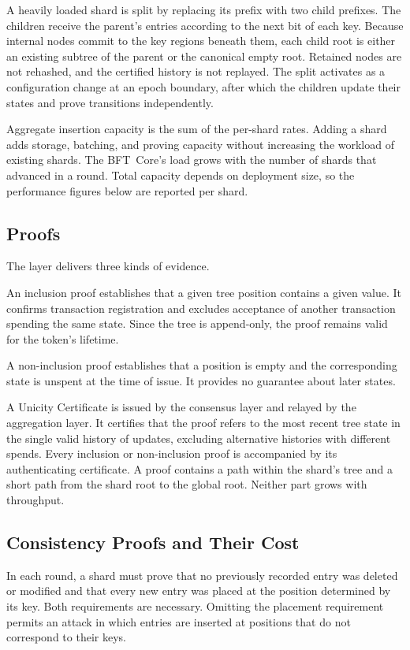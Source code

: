 A heavily loaded shard is split by replacing its prefix with two child prefixes. The children receive the parent's entries according to the next bit of each key. Because internal nodes commit to the key regions beneath them, each child root is either an existing subtree of the parent or the canonical empty root. Retained nodes are not rehashed, and the certified history is not replayed. The split activates as a configuration change at an epoch boundary, after which the children update their states and prove transitions independently.

Aggregate insertion capacity is the sum of the per-shard rates. Adding a shard adds storage, batching, and proving capacity without increasing the workload of existing shards. The BFT~Core's load grows with the number of shards that advanced in a round. Total capacity depends on deployment size, so the performance figures below are reported per shard.

\subsection{Proofs}

The layer delivers three kinds of evidence.

An inclusion proof establishes that a given tree position contains a given value. It confirms transaction registration and excludes acceptance of another transaction spending the same state. Since the tree is append-only, the proof remains valid for the token's lifetime.

A non-inclusion proof establishes that a position is empty and the corresponding state is unspent at the time of issue. It provides no guarantee about later states.

A Unicity Certificate is issued by the consensus layer and relayed by the aggregation layer. It certifies that the proof refers to the most recent tree state in the single valid history of updates, excluding alternative histories with different spends. Every inclusion or non-inclusion proof is accompanied by its authenticating certificate. A proof contains a path within the shard's tree and a short path from the shard root to the global root. Neither part grows with throughput.

\subsection{Consistency Proofs and Their Cost}

In each round, a shard must prove that no previously recorded entry was deleted or modified and that every new entry was placed at the position determined by its key. Both requirements are necessary. Omitting the placement requirement permits an attack in which entries are inserted at positions that do not correspond to their keys.

